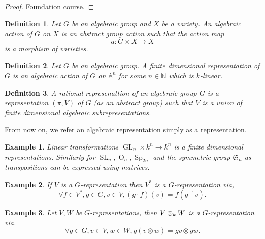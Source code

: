 \documentclass[10pt]{article}
\newtheorem{definition}{Definition}[section]
\newtheorem{example}{Example}[section]
\numberwithin{equation}{theorem}
\DeclareMathOperator{\GL}{GL}
\DeclareMathOperator{\SL}{SL}
\DeclareMathOperator{\Orth}{O}
\DeclareMathOperator{\Sp}{Sp}
\newcommand{\N}[0]{\mathbb{N}}
\newcommand{\A}[0]{\mathbb{A}}
\newcommand{\tens}[1]{%
  \mathbin{\mathop{\otimes}\displaylimits_{#1}}%
}
\begin{document}
\begin{proof}
  Foundation course.%
\end{proof}

\begin{definition}
  Let $G$ be an algebraic group and $X$ be a variety. An algebraic action of $G$ on $X$ is an abstract group action such that the action map
  \begin{equation*}
    a:G\times X\to X
  \end{equation*}
 is a morphism of varieties.
\end{definition}
\begin{definition}
  Let $G$ be an algebraic group. A finite dimensional representation of $G$ is an algebraic action of $G$ on $\A^n$ for some $n\in\N$ which is $k$-linear. 
\end{definition}
\begin{definition}
  A rational represenattion of an algebraic group $G$ is a representation $(\pi,V)$ of $G$ (as an abstract group) such that $V$ is a union of finite dimensional algebraic subrepresentations.
\end{definition}
From now on, we refer an algebraic representation simply as a representation.
\begin{example}
Linear transformations $\GL_n\times k^n\to k^n$ is a finite dimensional representations. Similarly for $\SL_n,\Orth_n,\Sp_{2n}$ and the symmetric group $\mathfrak{S}_n$ as transpositions can be expressed using matrices.
\end{example}
\begin{example}
If $V$ is a $G$-representation then $V^*$ is a $G$-representation via, 
\begin{equation*}
  \forall f\in V^*, g\in G, v\in V, (g\cdot f)(v) = f(g^{-1}v).
\end{equation*}
\end{example}
\begin{example}
  Let $V,W$ be $G$-representations, then $V\tens{k}W$ is a $G$-representation via.
  \begin{equation*}
    \forall g\in G,v\in V,w\in W, g(v\otimes w) = gv\otimes gw.
  \end{equation*}
\end{example}
\end{document}
